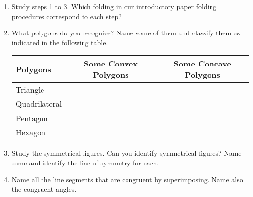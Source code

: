 \begin{enumerate}[A.]
	\begin{enumerate}
	\item Study steps 1 to 3. Which folding in our introductory paper folding procedures correspond to each step? 
	\item What polygons do you recognize? Name some of them and classify them as indicated in the following table.
	\begin{center}
	\begin{tabular}{lcc}
	\hline \hline
	Polygons & Some Convex Polygons & Some Concave Polygons\\
	\hline 
	Triangle & & \\
	Quadrilateral & & \\
	Pentagon & & \\
	Hexagon & & \\
	\hline 
	\end{tabular}
	\end{center}
	\item Study the symmetrical figures. Can you identify symmetrical figures? Name some and identify the line of symmetry for each.
	\item Name all the line segments that are congruent by superimposing. Name also the congruent angles.
	\end{enumerate}
\end{enumerate}
